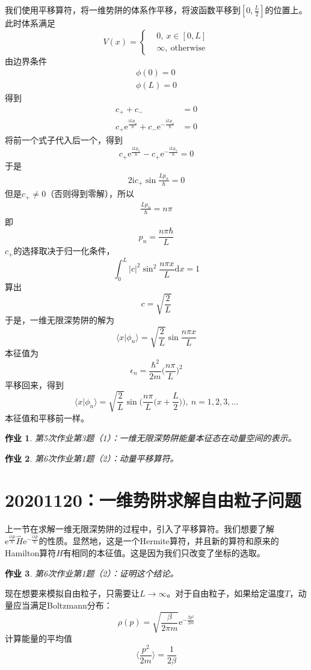 \documentclass[12pt]{article}
\newtheorem{asg}{作业}
\begin{document}
我们使用平移算符，将一维势阱的体系作平移，将波函数平移到$[0,\frac L2]$的位置上。此时体系满足
\begin{equation*}
    V(x) = \left \{
        \begin{aligned}
            &0,\ x\in [0, L]\\
            &\infty, \ \mathrm{otherwise}
        \end{aligned}
        \right.
\end{equation*}
由边界条件
\begin{align*}
    \phi(0)= 0\\
    \phi(L) = 0
\end{align*}
得到
\begin{align*}
    c_+ +c_- &= 0\\
    c_+\mathrm{e}^{\frac {\mathrm{i}Lp_n}{\hbar}}+c_-\mathrm{e}^{-\frac {\mathrm{i}Lp_n}{\hbar}} &= 0
\end{align*}
将前一个式子代入后一个，得到
\[ c_+\mathrm{e}^{\frac {\mathrm{i}Lp_n}{\hbar}}-c_+ \mathrm{e}^{-\frac {\mathrm{i}Lp_n}{\hbar}} = 0 \]
于是
\begin{align*}
    2\mathrm{i}c_+ \sin{\frac {Lp_n}{\hbar}} = 0
\end{align*}
但是$c_+ \neq 0$（否则得到零解），所以
\begin{align*}
    \frac {Lp_n}{\hbar} = n\pi
\end{align*}
即
\[ p_n = \frac {n\pi \hbar}{L} \]
$c_+$的选择取决于归一化条件，
\[ \int_0^L |c|^2 \sin^2{\frac {n\pi x}L}\mathrm{d}x = 1 \]
算出
\[ c = \sqrt{\frac 2L} \]
于是，一维无限深势阱的解为
\[ \langle x|\phi_n \rangle = \sqrt{\frac 2L} \sin{\frac {n\pi x}L} \]
本征值为
\[ \epsilon_n = \frac {\hbar^2}{2m} \bigg(\frac {n\pi}L\bigg)^2 \]
平移回来，得到
\[ \langle x|\phi_n \rangle = \sqrt{\frac 2L} \sin{\bigg(\frac {n\pi}L\bigg(x+\frac L2\bigg)\bigg)}, \ n=1,2,3,... \]
本征值和平移前一样。
\begin{asg}
    第5次作业第3题（1）：一维无限深势阱能量本征态在动量空间的表示。
\end{asg}
\begin{asg}
    第6次作业第1题（2）：动量平移算符。
\end{asg}

\section{20201120：一维势阱求解自由粒子问题}

上一节在求解一维无限深势阱的过程中，引入了平移算符。我们想要了解$\mathrm{e}^{\frac {\mathrm{i}\lambda \hat{p}}{\hbar}} \hat{H} \mathrm{e}^{-\frac {\mathrm{i}\lambda \hat{p}}{\hbar}}$的性质。显然地，这是一个Hermite算符，并且新的算符和原来的Hamilton算符$\hat{H}$有相同的本征值。这是因为我们只改变了坐标的选取。
\begin{asg}
    第6次作业第1题（2）：证明这个结论。
\end{asg}
现在想要来模拟自由粒子，只需要让$L \to \infty$。对于自由粒子，如果给定温度$T$，动量应当满足Boltzmann分布：
\[ \rho(p) = \sqrt{\frac {\beta}{2\pi m}}\mathrm{e}^{-\frac {\beta p^2}{2m}} \]
计算能量的平均值
\[ \langle \frac {p^2}{2m} \rangle = \frac 1{2\beta} \]
\end{document}
